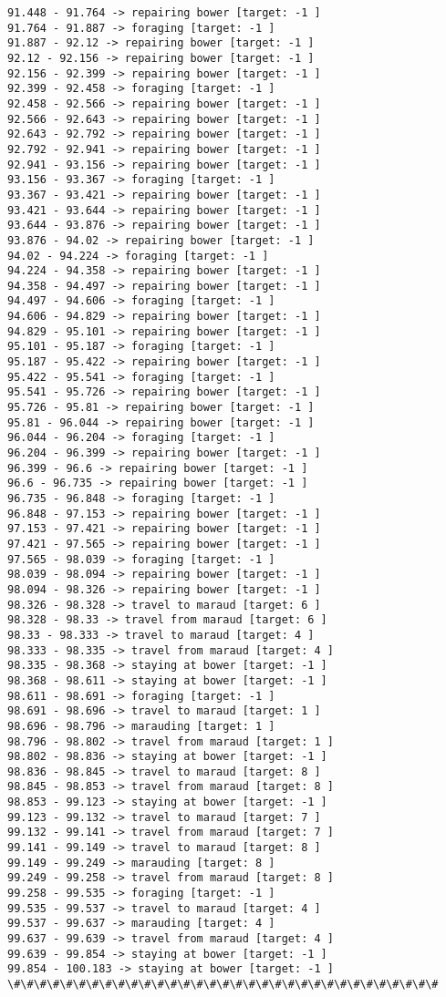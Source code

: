 \documentclass[11pt]{article}
\begin{document}
\begin{Verbatim}[commandchars=\\\{\}]
91.448 - 91.764 -> repairing bower [target: -1 ]
91.764 - 91.887 -> foraging [target: -1 ]
91.887 - 92.12 -> repairing bower [target: -1 ]
92.12 - 92.156 -> repairing bower [target: -1 ]
92.156 - 92.399 -> repairing bower [target: -1 ]
92.399 - 92.458 -> foraging [target: -1 ]
92.458 - 92.566 -> repairing bower [target: -1 ]
92.566 - 92.643 -> repairing bower [target: -1 ]
92.643 - 92.792 -> repairing bower [target: -1 ]
92.792 - 92.941 -> repairing bower [target: -1 ]
92.941 - 93.156 -> repairing bower [target: -1 ]
93.156 - 93.367 -> foraging [target: -1 ]
93.367 - 93.421 -> repairing bower [target: -1 ]
93.421 - 93.644 -> repairing bower [target: -1 ]
93.644 - 93.876 -> repairing bower [target: -1 ]
93.876 - 94.02 -> repairing bower [target: -1 ]
94.02 - 94.224 -> foraging [target: -1 ]
94.224 - 94.358 -> repairing bower [target: -1 ]
94.358 - 94.497 -> repairing bower [target: -1 ]
94.497 - 94.606 -> foraging [target: -1 ]
94.606 - 94.829 -> repairing bower [target: -1 ]
94.829 - 95.101 -> repairing bower [target: -1 ]
95.101 - 95.187 -> foraging [target: -1 ]
95.187 - 95.422 -> repairing bower [target: -1 ]
95.422 - 95.541 -> foraging [target: -1 ]
95.541 - 95.726 -> repairing bower [target: -1 ]
95.726 - 95.81 -> repairing bower [target: -1 ]
95.81 - 96.044 -> repairing bower [target: -1 ]
96.044 - 96.204 -> foraging [target: -1 ]
96.204 - 96.399 -> repairing bower [target: -1 ]
96.399 - 96.6 -> repairing bower [target: -1 ]
96.6 - 96.735 -> repairing bower [target: -1 ]
96.735 - 96.848 -> foraging [target: -1 ]
96.848 - 97.153 -> repairing bower [target: -1 ]
97.153 - 97.421 -> repairing bower [target: -1 ]
97.421 - 97.565 -> repairing bower [target: -1 ]
97.565 - 98.039 -> foraging [target: -1 ]
98.039 - 98.094 -> repairing bower [target: -1 ]
98.094 - 98.326 -> repairing bower [target: -1 ]
98.326 - 98.328 -> travel to maraud [target: 6 ]
98.328 - 98.33 -> travel from maraud [target: 6 ]
98.33 - 98.333 -> travel to maraud [target: 4 ]
98.333 - 98.335 -> travel from maraud [target: 4 ]
98.335 - 98.368 -> staying at bower [target: -1 ]
98.368 - 98.611 -> staying at bower [target: -1 ]
98.611 - 98.691 -> foraging [target: -1 ]
98.691 - 98.696 -> travel to maraud [target: 1 ]
98.696 - 98.796 -> marauding [target: 1 ]
98.796 - 98.802 -> travel from maraud [target: 1 ]
98.802 - 98.836 -> staying at bower [target: -1 ]
98.836 - 98.845 -> travel to maraud [target: 8 ]
98.845 - 98.853 -> travel from maraud [target: 8 ]
98.853 - 99.123 -> staying at bower [target: -1 ]
99.123 - 99.132 -> travel to maraud [target: 7 ]
99.132 - 99.141 -> travel from maraud [target: 7 ]
99.141 - 99.149 -> travel to maraud [target: 8 ]
99.149 - 99.249 -> marauding [target: 8 ]
99.249 - 99.258 -> travel from maraud [target: 8 ]
99.258 - 99.535 -> foraging [target: -1 ]
99.535 - 99.537 -> travel to maraud [target: 4 ]
99.537 - 99.637 -> marauding [target: 4 ]
99.637 - 99.639 -> travel from maraud [target: 4 ]
99.639 - 99.854 -> staying at bower [target: -1 ]
99.854 - 100.183 -> staying at bower [target: -1 ]
\#\#\#\#\#\#\#\#\#\#\#\#\#\#\#\#\#\#\#\#\#\#\#\#\#\#\#\#\#\#\#\#\#



\end{Verbatim}
\end{document}
